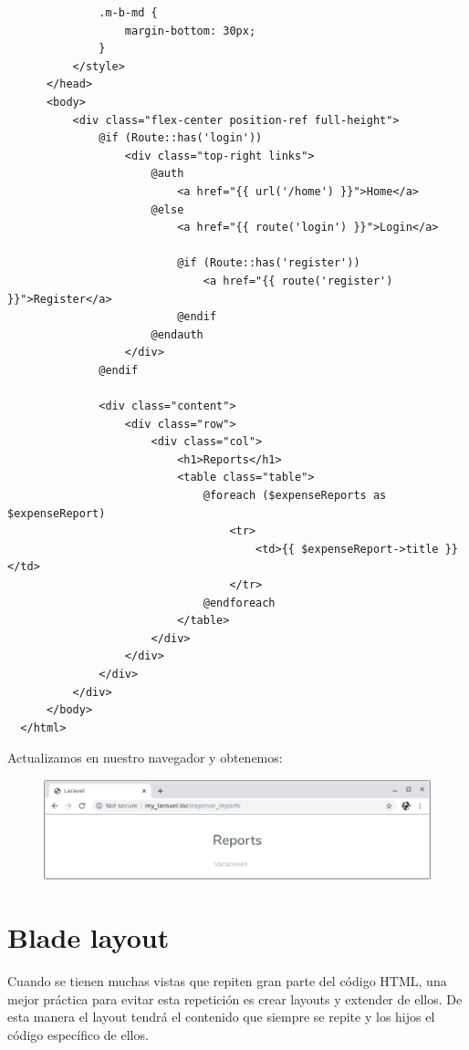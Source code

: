 \documentclass{article}
\begin{document}
\begin{verbatim}
              .m-b-md {
                  margin-bottom: 30px;
              }
          </style>
      </head>
      <body>
          <div class="flex-center position-ref full-height">
              @if (Route::has('login'))
                  <div class="top-right links">
                      @auth
                          <a href="{{ url('/home') }}">Home</a>
                      @else
                          <a href="{{ route('login') }}">Login</a>

                          @if (Route::has('register'))
                              <a href="{{ route('register') }}">Register</a>
                          @endif
                      @endauth
                  </div>
              @endif

              <div class="content">
                  <div class="row">
                      <div class="col">
                          <h1>Reports</h1>
                          <table class="table">
                              @foreach ($expenseReports as $expenseReport)
                                  <tr>
                                      <td>{{ $expenseReport->title }}</td>
                                  </tr>
                              @endforeach
                          </table>
                      </div>
                  </div>
              </div>
          </div>
      </body>
  </html>
\end{verbatim}

Actualizamos en nuestro navegador y obtenemos:\\

\begin{figure}[h!]
  \centering
  \includegraphics[scale=0.5]{./Pictures/053_expense_reports_ok.png}
\end{figure}



\section{Blade layout}%
Cuando se tienen muchas vistas que repiten gran parte del código HTML, una
mejor práctica para evitar esta repetición es crear layouts y extender de
ellos. De esta manera el layout tendrá el contenido que siempre se repite y los
hijos el código específico de ellos.\\
\end{document}
